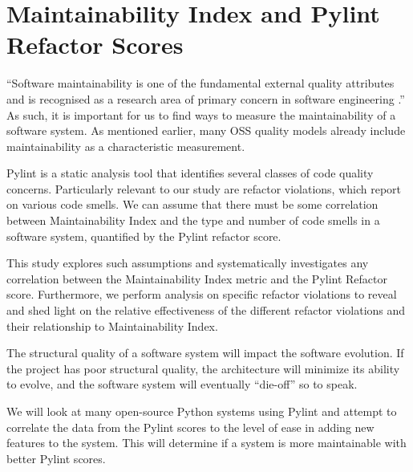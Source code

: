 \section{Maintainability Index and Pylint Refactor Scores}

``Software maintainability is one of the fundamental external quality attributes and is recognised as a research area of primary concern in software engineering \cite{alsolai:2019}.'' As such, it is important for us to find ways to measure the maintainability of a software system. As mentioned earlier, many OSS quality models already include maintainability as a characteristic measurement.

Pylint is a static analysis tool that identifies several classes of code quality concerns. Particularly relevant to our study are refactor violations, which report on various code smells. We can assume that there must be some correlation between Maintainability Index and the type and number of code smells in a software system, quantified by the Pylint refactor score.

This study explores such assumptions and systematically investigates any correlation between the Maintainability Index metric and the Pylint Refactor score. Furthermore, we perform analysis on specific refactor violations to reveal and shed light on the relative effectiveness of the different refactor violations and their relationship to Maintainability Index.

The structural quality of a software system will impact the software evolution. If the project has poor structural quality, the architecture will minimize its ability to evolve, and the software system will eventually ``die-off'' so to speak.

We will look at many open-source Python systems using Pylint and attempt to correlate the data from the Pylint scores to the level of ease in adding new features to the system. This will determine if a system is more maintainable with better Pylint scores.

